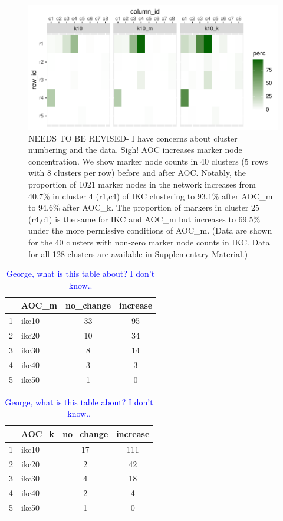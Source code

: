 \documentclass[12pt, oneside]{article}   	%
\begin{document}
\begin{figure}[H]
	\centering
	 \includegraphics[width=0.7\linewidth]{marker_comps_wide.pdf} 
\caption{NEEDS TO BE REVISED- I have concerns about cluster numbering and the data. Sigh! AOC increases marker node concentration. We show marker node counts in 40 clusters (5 rows with 8 clusters per row) before and after AOC.  Notably, the proportion of 1021 marker nodes in the network increases from 40.7\% in cluster 4 (r1,c4) of IKC clustering to 93.1\% after AOC\_m to 94.6\% after AOC\_k. The proportion of markers in cluster 25 (r4,c1) is the same for IKC and AOC\_m but increases to  69.5\% under the more permissive conditions of AOC\_m. (Data are shown for the 40 clusters with non-zero marker node counts in IKC. Data for all 128 clusters are available in Supplementary Material.)}
\label{fig:marker-node-concentration}
\end{figure}


\clearpage
\begin{table}[H]
\centering
\begin{tabular}{rlcc}
  \hline
 & AOC\_m & no\_change & increase \\ 
  \hline
1 & ikc10 &  33 &  95 \\ 
2 & ikc20 &  10 &  34 \\ 
3 & ikc30 &   8 &  14 \\ 
4 & ikc40 &   3 &   3 \\ 
5 & ikc50 &   1 &   0 \\ 
   \hline
\end{tabular}
\quad
\begin{tabular}{rlcc}
  \hline
 & AOC\_k& no\_change & increase \\ 
  \hline
1 & ikc10 &  17 & 111 \\ 
2 & ikc20 &   2 &  42 \\ 
3 & ikc30 &   4 &  18 \\ 
4 & ikc40 &   2 &   4 \\ 
5 & ikc50 &   1 &   0 \\ 
   \hline
\end{tabular}
\caption{\textcolor{blue}{George, what is this table about? I don't know..}}
\label{tab:tab-unknown}
\end{table}
\end{document}
